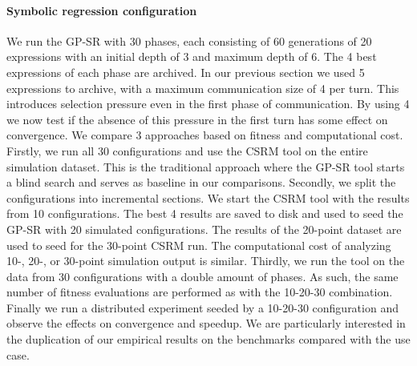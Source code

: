 \paragraph{Symbolic regression configuration}
We run the GP-SR with 30 phases, each consisting of 60 generations of 20 expressions with an initial depth of 3 and maximum depth of 6. The 4 best expressions of each phase are archived. %
In our previous section we used 5 expressions to archive, with a maximum communication size of 4 per turn. This introduces selection pressure even in the first phase of communication. By using 4 we now test if the absence of this pressure in the first turn has some effect on convergence.
We compare 3 approaches based on fitness and computational cost. Firstly, we run all 30 configurations and use the CSRM tool on the entire simulation dataset. This is the traditional approach where the GP-SR tool starts a blind search and serves as baseline in our comparisons.
Secondly, we split the configurations into incremental sections. We start the CSRM tool with the results from 10 configurations. The best 4 results are saved to disk and used to seed the GP-SR with  20 simulated configurations. The results of the 20-point dataset are used to seed for the 30-point CSRM run. The computational cost of analyzing 10-, 20-, or 30-point simulation output is similar. 
Thirdly, we run the tool on the data from 30 configurations with a double amount of phases. As such, the same number of fitness evaluations are performed as with the 10-20-30 combination. 
Finally we run a distributed experiment seeded by a 10-20-30 configuration and observe the effects on convergence and speedup. We are particularly interested in the duplication of our empirical results on the benchmarks compared with the use case.

